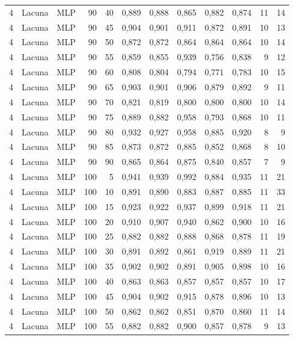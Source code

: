 \begin{longtable}{@{}rllrrrrrrrrr@{}}
4 & Lacuna & MLP & 90 & 40 & 0,889 & 0,888 & 0,865 & 0,882 & 0,874 & 11 & 14 \\
4 & Lacuna & MLP & 90 & 45 & 0,904 & 0,901 & 0,911 & 0,872 & 0,891 & 10 & 13 \\
4 & Lacuna & MLP & 90 & 50 & 0,872 & 0,872 & 0,864 & 0,864 & 0,864 & 10 & 14 \\
4 & Lacuna & MLP & 90 & 55 & 0,859 & 0,855 & 0,939 & 0,756 & 0,838 & 9 & 12 \\
4 & Lacuna & MLP & 90 & 60 & 0,808 & 0,804 & 0,794 & 0,771 & 0,783 & 10 & 15 \\
4 & Lacuna & MLP & 90 & 65 & 0,903 & 0,901 & 0,906 & 0,879 & 0,892 & 9 & 11 \\
4 & Lacuna & MLP & 90 & 70 & 0,821 & 0,819 & 0,800 & 0,800 & 0,800 & 10 & 14 \\
4 & Lacuna & MLP & 90 & 75 & 0,889 & 0,882 & 0,958 & 0,793 & 0,868 & 10 & 11 \\
4 & Lacuna & MLP & 90 & 80 & 0,932 & 0,927 & 0,958 & 0,885 & 0,920 & 8 & 9 \\
4 & Lacuna & MLP & 90 & 85 & 0,873 & 0,872 & 0,885 & 0,852 & 0,868 & 8 & 10 \\
4 & Lacuna & MLP & 90 & 90 & 0,865 & 0,864 & 0,875 & 0,840 & 0,857 & 7 & 9 \\
4 & Lacuna & MLP & 100 & 5 & 0,941 & 0,939 & 0,992 & 0,884 & 0,935 & 11 & 21 \\
4 & Lacuna & MLP & 100 & 10 & 0,891 & 0,890 & 0,883 & 0,887 & 0,885 & 11 & 33 \\
4 & Lacuna & MLP & 100 & 15 & 0,923 & 0,922 & 0,937 & 0,899 & 0,918 & 11 & 21 \\
4 & Lacuna & MLP & 100 & 20 & 0,910 & 0,907 & 0,940 & 0,862 & 0,900 & 10 & 16 \\
4 & Lacuna & MLP & 100 & 25 & 0,882 & 0,882 & 0,888 & 0,868 & 0,878 & 11 & 19 \\
4 & Lacuna & MLP & 100 & 30 & 0,891 & 0,892 & 0,861 & 0,919 & 0,889 & 11 & 21 \\
4 & Lacuna & MLP & 100 & 35 & 0,902 & 0,902 & 0,891 & 0,905 & 0,898 & 10 & 16 \\
4 & Lacuna & MLP & 100 & 40 & 0,863 & 0,863 & 0,857 & 0,857 & 0,857 & 10 & 17 \\
4 & Lacuna & MLP & 100 & 45 & 0,904 & 0,902 & 0,915 & 0,878 & 0,896 & 10 & 13 \\
4 & Lacuna & MLP & 100 & 50 & 0,862 & 0,862 & 0,851 & 0,870 & 0,860 & 11 & 14 \\
4 & Lacuna & MLP & 100 & 55 & 0,882 & 0,882 & 0,900 & 0,857 & 0,878 & 9 & 13 \\

\end{longtable}
